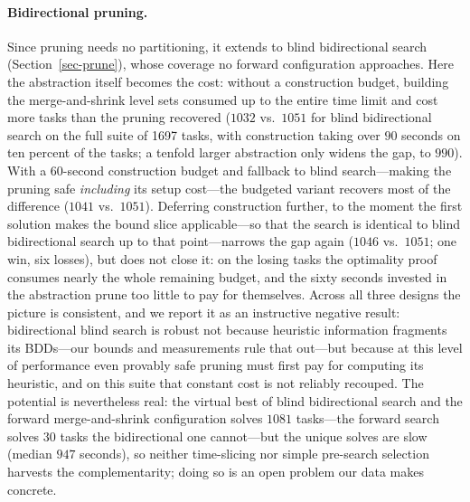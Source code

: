 \documentclass[letterpaper]{article}
\theoremstyle{plain}
\theoremstyle{definition}
\theoremstyle{remark}
\begin{document}
\paragraph{Bidirectional pruning.}
Since pruning needs no partitioning, it extends to blind bidirectional
search (Section~\ref{sec-prune}), whose coverage no forward
configuration approaches. Here the abstraction itself becomes the cost:
without a construction budget, building the merge-and-shrink level sets
consumed up to the entire time limit and cost more tasks than the
pruning recovered ($1032$ vs.\ $1051$ for blind bidirectional search on
the full suite of 1697 tasks, with construction taking over $90$ seconds
on ten percent of the tasks; a tenfold larger abstraction only widens
the gap, to $990$). With a $60$-second construction budget and
fallback to blind search---making the pruning safe \emph{including} its
setup cost---the budgeted variant recovers most of the difference
($1041$ vs.\ $1051$). Deferring construction further, to the moment the
first solution makes the bound slice applicable---so that the search is
identical to blind bidirectional search up to that point---narrows the
gap again ($1046$ vs.\ $1051$; one win, six losses), but does not close
it: on the losing tasks the optimality proof consumes nearly the whole
remaining budget, and the sixty seconds invested in the abstraction
prune too little to pay for themselves. Across all three designs the
picture is consistent, and we report it as an instructive negative
result: bidirectional blind search is robust not because heuristic
information fragments its BDDs---our bounds and measurements rule that
out---but because at this level of performance even provably safe
pruning must first pay for computing its heuristic, and on this suite
that constant cost is not reliably recouped. The potential is
nevertheless real: the virtual best of blind bidirectional search and
the forward merge-and-shrink configuration solves $1081$ tasks---the
forward search solves $30$ tasks the bidirectional one cannot---but the
unique solves are slow (median $947$ seconds), so neither time-slicing
nor simple pre-search selection harvests the complementarity; doing so
is an open problem our data makes concrete.
\end{document}
